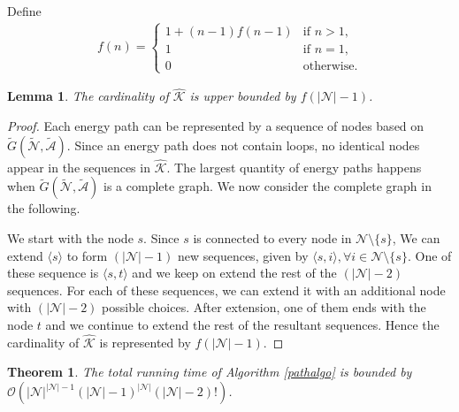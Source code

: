 \documentclass[journal]{IEEEtran}
\newtheorem{lemma}{\textbf{Lemma}}
\newtheorem{theorem}{\textbf{Theorem}}
\begin{document}
Define 
\begin{align} \label{fn}
f(n)=\begin{cases}
1+(n-1)f(n-1) & \mbox{if } n>1,\\
1							& \mbox{if } n=1,\\
0							& \mbox{otherwise}. 
\end{cases}
\end{align}
\begin{lemma} \label{lm:cardP}
The cardinality of $\hat{\mathcal{K}}$ is upper bounded by $f(|\mathcal{N}|-1)$.
\end{lemma}
\begin{proof}
Each energy path can be represented by a sequence of nodes based on $\tilde{G}(\tilde{\mathcal{N}},\tilde{\mathcal{A}})$. Since an energy path does not contain loops, no identical nodes appear in the sequences in $\hat{\mathcal{K}}$. The largest quantity of energy paths happens when $\tilde{G}(\tilde{\mathcal{N}},\tilde{\mathcal{A}})$ is a complete graph. We now consider the complete graph in the following. 

We start with the node $s$. Since $s$ is connected to every node in $\mathcal{N}\setminus\{s\}$, We can extend $\langle s\rangle$ to form $(|\mathcal{N}|-1)$ new sequences, given by $\langle s, i\rangle,\forall i\in \mathcal{N}\setminus\{s\}$. One of these sequence is $\langle s, t\rangle$ and we keep on extend the rest of the $(|\mathcal{N}|-2)$ sequences. For each of these sequences, we can extend it with an additional node with $(|\mathcal{N}|-2)$ possible choices. After extension, one of them ends with the node $t$ and we continue to extend the rest of the resultant sequences. Hence the cardinality of $\hat{\mathcal{K}}$ is represented by $f(|\mathcal{N}|-1)$.
\end{proof}

\begin{theorem} \label{thm:runtime}
The total running time of Algorithm \ref{pathalgo} is bounded by $\mathcal{O}(|\mathcal{N}|^{|\mathcal{N}|-1}(|\mathcal{N}|-1)^{|\mathcal{N}|}(|\mathcal{N}|-2)!)$.
\end{theorem}
\end{document}
